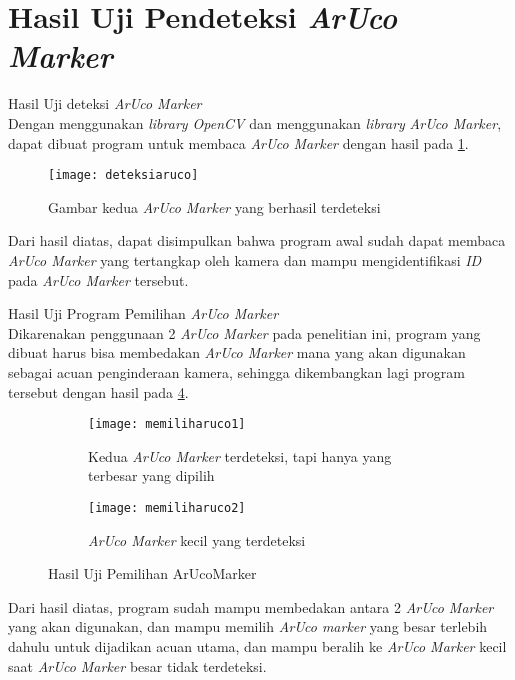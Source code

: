 \section{Hasil Uji Pendeteksi \textit{ArUco Marker}}
\begin{packed_item}
	\item Hasil Uji deteksi \textit{ArUco Marker}
	\\ Dengan menggunakan \textit{library OpenCV} dan menggunakan \textit{library} \textit{ArUco Marker}, dapat dibuat program untuk membaca \textit{ArUco Marker} dengan hasil pada \cref{fig:deteksiaruco}.
	
	\begin{figure}[H]
		\centering
		\texttt{[image: deteksiaruco]}
		\caption{Gambar kedua \textit{ArUco Marker} yang berhasil terdeteksi}
		\label{fig:deteksiaruco}
	\end{figure}
	
	Dari hasil diatas, dapat disimpulkan bahwa program awal sudah dapat membaca \textit{ArUco Marker} yang tertangkap oleh kamera dan mampu mengidentifikasi \textit{ID} pada \textit{ArUco Marker} tersebut.\\
	
	\item Hasil Uji Program Pemilihan \textit{ArUco Marker}
	\\ Dikarenakan penggunaan 2 \textit{ArUco Marker} pada penelitian ini, program yang dibuat harus bisa membedakan \textit{ArUco Marker} mana yang akan digunakan sebagai acuan penginderaan kamera, sehingga dikembangkan lagi program tersebut dengan hasil pada \cref{fig:memiliharuco}.
	
	\begin{figure}[H]
		\centering
		\begin{subfigure}[b]{0.4\textwidth}
			\centering
			\texttt{[image: memiliharuco1]}
			\caption{Kedua \textit{ArUco Marker} terdeteksi, tapi hanya yang terbesar yang dipilih}
			\label{fig:memiliharuco1}
		\end{subfigure}
		\hfill
		\begin{subfigure}[b]{0.4\textwidth}
			\centering
			\texttt{[image: memiliharuco2]}
			\caption{\textit{ArUco Marker} kecil yang terdeteksi}
			\label{fig:memiliharuco2}
		\end{subfigure}
		\caption{Hasil Uji Pemilihan ArUcoMarker}
		\label{fig:memiliharuco}
	\end{figure}
	
	Dari hasil diatas, program sudah mampu membedakan antara 2 \textit{ArUco Marker} yang akan digunakan, dan mampu memilih \textit{ArUco marker} yang besar terlebih dahulu untuk dijadikan acuan utama, dan mampu beralih ke \textit{ArUco Marker} kecil saat \textit{ArUco Marker} besar tidak terdeteksi.\\
	

\end{packed_item}
